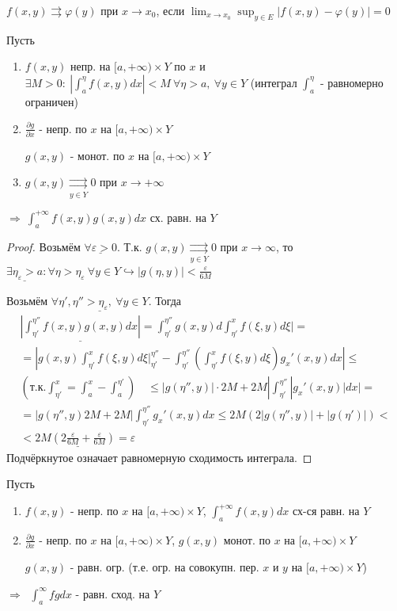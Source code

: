 \documentclass{article}
\theoremstyle{definition}
\numberwithin{theorem}{section}
\numberwithin{lemma}{section}
\numberwithin{definition}{section}
\numberwithin{corollary}{section}
\numberwithin{equation}{section}
\let\phi\varphi
\let\epsilon\varepsilon
\let\implies\Rightarrow
\let\true\hookrightarrow
\newcommand{\pd}[2]{\frac{\partial{#1}}{\partial{#2}}}
\begin{document}

\begin{definition}
  $f(x,y)\rightrightarrows \phi(y)$ при $x\to x_0$,
  если $\lim_{x\to x_0}\sup_{y\in E}|f(x,y)-\phi(y)|=0$
\end{definition}
\begin{theorem}
  Пусть
  \begin{enumerate}
    \item $f(x,y)$ непр. на $[a,+\infty)\times Y$ по $x$
      и $\exists M>0: \ |\int_{a}^{\eta}f(x,y)dx|<M \ \forall \eta>a, \ \forall y \in Y$
      (интеграл $\int_{a}^{\eta}$ - равномерно ограничен)
    \item $\pd{g}{x}$ - непр. по $x$ на $[a,+\infty)\times Y$

      $g(x,y)$ - монот. по $x$ на $[a,+\infty)\times Y$
    \item $g(x,y) \underset{y\in Y}{\rightrightarrows} 0$ при $x \to +\infty$ 
  \end{enumerate}
  $\implies \ \int_{a}^{+\infty}f(x,y)g(x,y)dx$ сх. равн. на $Y$
\end{theorem}
\begin{proof}
  Возьмём $\underline{\forall \epsilon > 0}$. Т.к. $g(x,y) \underset{y\in Y}{\rightrightarrows}0$ при $x\to \infty$,
  то $\underline{\exists \eta_\epsilon >a} : \forall \eta>\eta_\epsilon \ \forall y \in Y \true |g(\eta,y)| < \frac{\epsilon}{6M}$

  Возьмём $\underline {\forall \eta', \eta'' > \eta_\epsilon, \ \forall y \in Y}$.
  Тогда
  \begin{gather*}
    \underline{|\int_{\eta'}^{\eta''}f(x,y)g(x,y)dx|}=\int_{\eta'}^{\eta''}g(x,y)d\int_{\eta'}^{x}f(\xi,y)d\xi|= \\ 
    = |g(x,y)\int_{\eta'}^{x}f(\xi,y)d\xi\big|_{\eta'}^{\eta''}-\int_{\eta'}^{\eta''}(\int_{\eta'}^{x}f(\xi,y)d\xi)g_x'(x,y)dx| \le \\ 
    (\text{т.к.} \int_{\eta'}^{x}=\int_{a}^{x}-\int_{a}^{\eta'}) \quad \le |g(\eta'',y)|\cdot 2M + 2M|\int_{\eta'}^{\eta''}|g_x'(x,y)|dx| = \\ 
    =|g(\eta'',y)2M+2M|\int_{\eta'}^{\eta''}g_x'(x,y)dx \le 2M (2|g(\eta'',y)|+|g(\eta')|) < \\ 
    \underline{< 2M(2\frac{\epsilon}{6M}+\frac{\epsilon}{6M}) = \epsilon}
  \end{gather*}
  Подчёркнутое означает равномерную сходимость интеграла.
\end{proof}
\begin{theorem}
  Пусть
  \begin{enumerate}
    \item $f(x,y)$ - непр. по $x$ на $[a,+\infty)\times Y$, $\int_{a}^{+\infty}f(x,y)dx$ сх-ся равн. на $Y$
    \item $\pd{g}{x}$ - непр. по $x$ на $[a,+\infty)\times Y$, $g(x,y)$ монот. по $x$ на $[a,+\infty)\times Y$

      $g(x,y)$ - равн. огр. (т.е. огр. на совокупн. пер. $x$ и $y$ на $[a,+\infty)\times Y$)
  \end{enumerate}
  $\implies$ $\ \int_{a}^{\infty}fgdx$ - равн. сход. на $Y$
\end{theorem}
\end{document}

